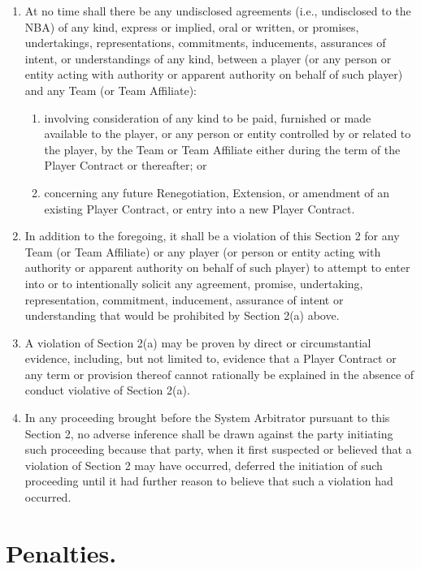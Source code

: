 \documentclass[
]{book}
\providecommand{\tightlist}{%
  \setlength{\itemsep}{0pt}\setlength{\parskip}{0pt}}
\begin{document}
\begin{enumerate}
\def\labelenumi{(\alph{enumi})}
\tightlist
\item
  At no time shall there be any undisclosed agreements (i.e., undisclosed to the NBA) of any kind, express or implied, oral or written, or promises, undertakings, representations, commitments, inducements, assurances of intent, or understandings of any kind, between a player (or any person or entity acting with authority or apparent authority on behalf of such player) and any Team (or Team Affiliate):

  \begin{enumerate}
  \def\labelenumii{(\roman{enumii})}
  \tightlist
  \item
    involving consideration of any kind to be paid, furnished or made available to the player, or any person or entity controlled by or related to the player, by the Team or Team Affiliate either during the term of the Player Contract or thereafter; or
  \item
    concerning any future Renegotiation, Extension, or amendment of an existing Player Contract, or entry into a new Player Contract.
  \end{enumerate}
\item
  In addition to the foregoing, it shall be a violation of this Section 2 for any Team (or Team Affiliate) or any player (or person or entity acting with authority or apparent authority on behalf of such player) to attempt to enter into or to intentionally solicit any agreement, promise, undertaking, representation, commitment, inducement, assurance of intent or understanding that would be prohibited by Section 2(a) above.
\item
  A violation of Section 2(a) may be proven by direct or circumstantial evidence, including, but not limited to, evidence that a Player Contract or any term or provision thereof cannot rationally be explained in the absence of conduct violative of Section 2(a).
\item
  In any proceeding brought before the System Arbitrator pursuant to this Section 2, no adverse inference shall be drawn against the party initiating such proceeding because that party, when it first suspected or believed that a violation of Section 2 may have occurred, deferred the initiation of such proceeding until it had further reason to believe that such a violation had occurred.
\end{enumerate}

\hypertarget{penalties.}{%
\section{Penalties.}\label{penalties.}}
\end{document}
